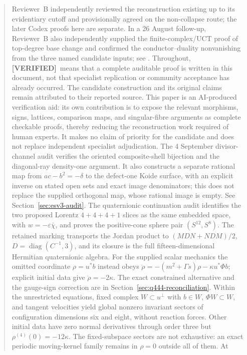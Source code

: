 \documentclass[11pt,letterpaper]{article}
\newcommand{\Status}[2]{\textcolor{#1}{\textbf{[#2]}}}
\newcommand{\Verified}{\Status{Verified}{VERIFIED}}
\theoremstyle{definition}
\theoremstyle{remark}
\begin{document}
\begin{abstract}
 Reviewer~B independently reviewed the reconstruction existing up to its
evidentiary cutoff and provisionally agreed on the non-collapse route; the
later Codex proofs here are separate.  In a 26 August follow-up, Reviewer~B
also independently supplied the finite-complex/UCT proof of top-degree base
change and confirmed the conductor--duality nonvanishing from the three named
candidate inputs; see \cite{ReviewerBValidation2026}.  Throughout, \Verified\ means that a
complete auditable proof is written in this document, not that specialist
replication or community acceptance has already occurred.  The candidate
construction and its original claims remain attributed to their reported
source.  This paper is an AI-produced verification aid: its own contribution
is to expose the relevant morphisms, signs, lattices, comparison maps, and
singular-fibre arguments as complete checkable proofs, thereby reducing the
reconstruction work required of human experts.  It makes no claim of priority
for the candidate and does not replace independent specialist adjudication.
The 4 September divisor-channel audit verifies the oriented composite-shell
bijection and the diagonal-ray density-one argument. It also constructs a
separate rational map from $ac-b^2=-\delta$ to the defect-one Koide surface,
with an explicit inverse on stated open sets and exact image denominators;
this does not replace the supplied orthogonal map, whose rational image is
empty. See Section~\ref{sec:esv3-audit}.
The quaternionic continuation audit identifies the two proposed Lorentz
$4+4+4+1$ slices as the same embedded space, with
$w=-\varepsilon\bar\chi$, and proves the positive-cone sphere pair
$(S^{12},S^8)$. The retained marking transports the Jordan product to
$(MDN+NDM)/2$, $D=\operatorname{diag}(C^{-1},3)$, and its closure is the
full fifteen-dimensional Hermitian quaternionic algebra. For the supplied
scalar mechanics the omitted coordinate $\rho=u^*b$ instead obeys
$\ddot\rho=-(m^2+\Gamma s)\rho-\kappa u^*\Phi b$; explicit initial data
give $\ddot\rho=-2\kappa$. The exact constrained alternative and the
gauge-sign correction are in Section~\ref{sec:q444-reconciliation}.
Within the unrestricted equations, fixed complex $W\subset u^\perp$
with $b\in W$, $\Phi W\subset W$, and tangent velocities yield global
nonzero invariant sectors of configuration dimensions six and eight,
without reaction forces. Other initial data have zero normal derivatives
through order three but $\rho^{(4)}(0)=-12\kappa$.
The fixed-subspace sectors are not exhaustive: an exact periodic
moving-kernel family remains in $\rho=0$ outside all of them. At

\end{abstract}
\end{document}
